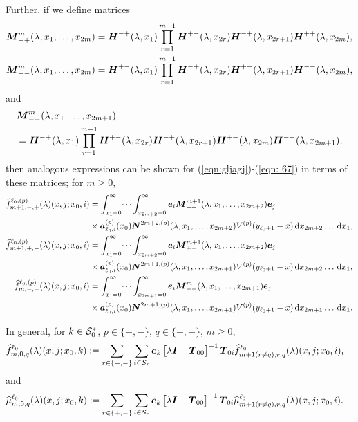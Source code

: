 Further, if we define matrices
\begin{align*}
	\boldsymbol M^{m}_{-+}(\lambda,x_1,\dots,x_{2m}) &= \boldsymbol H^{-+}(\lambda,x_1)\prod_{r=1}^{m-1}\boldsymbol H^{+-}(\lambda,x_{2r}) \boldsymbol H^{-+}(\lambda,x_{2r+1}) \boldsymbol H^{++}(\lambda,x_{2m}),
	\\\boldsymbol M^{m}_{+-}(\lambda,x_1,\dots,x_{2m}) &= \boldsymbol H^{+-}(\lambda,x_1)\prod_{r=1}^{m-1}\boldsymbol H^{-+}(\lambda,x_{2r}) \boldsymbol H^{+-}(\lambda,x_{2r+1}) \boldsymbol H^{--}(\lambda,x_{2m}),
\end{align*}
and
\begin{align*}
	&\boldsymbol M^{m}_{--}(\lambda,x_1,\dots,x_{2m+1}) \nonumber 
	\\&= \boldsymbol H^{-+}(\lambda,x_1)\prod_{r=1}^{m-1}\boldsymbol H^{+-}(\lambda,x_{2r}) \boldsymbol H^{-+}(\lambda,x_{2r+1}) \boldsymbol H^{+-}(\lambda,x_{2m}) 
	\boldsymbol H^{--}(\lambda,x_{2m+1}),\nonumber 
\end{align*}
then analogous expressions can be shown for (\ref{eqn:gljagj})-(\ref{eqn: 67}) in terms of these matrices; for \(m\geq 0\), 
\begin{align*}
	\widehat f^{\ell_0,(p)}_{m+1,-,+}(\lambda)(x, j; x_0,i) &= 
		\int_{x_1=0}^\infty \dots \int_{x_{2m+2}=0}^\infty \boldsymbol e_i\boldsymbol M^{m+1}_{-+}(\lambda,x_1,\dots,x_{2m+2})\boldsymbol e_j \nonumber 
		\\&\times \boldsymbol a_{\ell_0,i}^{(p)}(x_0) \boldsymbol N^{2m+2,(p)}(\lambda,x_1,\dots,x_{2m+2}) V^{(p)}(y_{\ell_0+1}-x)\, \mathrm{d} x_{2m+2}\dots\, \mathrm{d} x_1,
	\\ \widehat f^{\ell_0,(p)}_{m+1,+,-}(\lambda)(x, j; x_0,i) &= 
		\int_{x_1=0}^\infty \dots \int_{x_{2m+2}=0}^\infty \boldsymbol e_i\boldsymbol M^{m+1}_{+-}(\lambda,x_1,\dots,x_{2m+2})\boldsymbol e_j \nonumber 
		\\&\times \boldsymbol a_{\ell_0,i}^{(p)}(x_0) \boldsymbol N^{2m+1,(p)}(\lambda,x_1,\dots,x_{2m+1}) V^{(p)}(y_{\ell_0+1}-x)\, \mathrm{d} x_{2m+2}\dots\, \mathrm{d} x_1,
	\\ \widehat f^{\ell_0,(p)}_{m,-,-}(\lambda)(x, j; x_0,i) &= 
		\int_{x_1=0}^\infty \dots \int_{x_{2m+1}=0}^\infty \boldsymbol e_i\boldsymbol M^m_{--}(\lambda,x_1,\dots,x_{2m+1})\boldsymbol e_j \nonumber 
		\\&\times \boldsymbol a_{\ell_0,i}^{(p)}(x_0) \boldsymbol N^{2m+1,(p)}(\lambda,x_1,\dots,x_{2m+1}) V^{(p)}(y_{\ell_0+1}-x)\, \mathrm{d} x_{2m+1}\dots\, \mathrm{d} x_1.
\end{align*}

In general, for \(k\in\mathcal{S}_0^*\), \(p\in \{+,-\}, \, q\in\{+,-\}\), \(m\geq 0\),
\begin{align}
	\widehat f_{m,0,q}^{\ell_0}(\lambda)(x,j;x_0,k)  
	&:= \sum_{r\in\{+,-\}}\sum_{i\in\mathcal{S}_r}\boldsymbol e_k\begin{bmatrix} \lambda \boldsymbol I - \boldsymbol T_{00} \end{bmatrix}^{-1}\boldsymbol T_{0i}\widehat f_{m+1(r\neq q),r,q}^{\ell_0}(\lambda)(x,j;x_0,i), \label{eqn: vma}
\end{align}
and
\begin{align}
	\widehat \mu_{m,0,q}^{\ell_0}(\lambda)(x,j;x_0,k) \label{eqn:kdneee}
	&:= \sum_{r\in\{+,-\}}\sum_{i\in\mathcal{S}_r}\boldsymbol e_k\begin{bmatrix} \lambda \boldsymbol I - \boldsymbol T_{00} \end{bmatrix}^{-1}\boldsymbol T_{0i}\widehat \mu_{m+1(r\neq q),r,q}^{\ell_0}(\lambda)(x,j;x_0,i).
\end{align}


